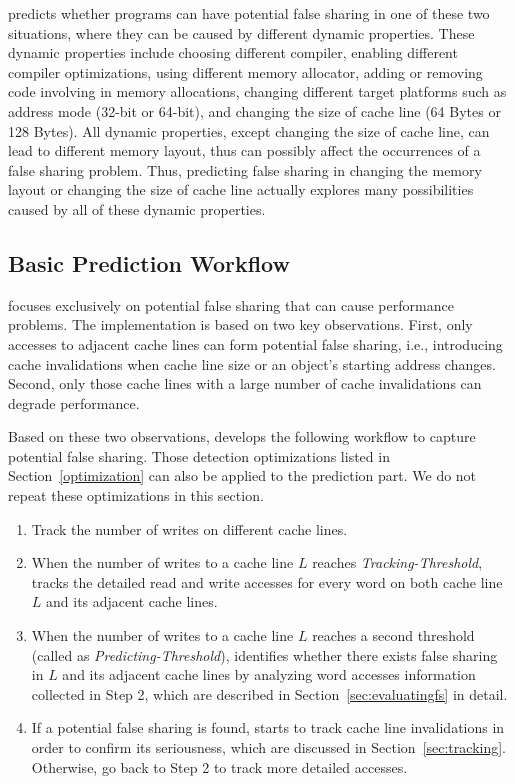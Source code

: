 \Predator{} predicts whether programs can have potential false sharing in one of these two situations, where they can be caused by different dynamic properties. These dynamic properties include choosing different compiler, enabling different compiler optimizations, using different memory allocator, adding or removing code involving in memory allocations, changing different target platforms such as address mode (32-bit or 64-bit), and changing the size of cache line (64 Bytes or 128 Bytes). 
All dynamic properties, except changing the size of cache line, can lead to different memory layout, thus can possibly affect the occurrences of a false sharing problem. Thus, predicting false sharing in changing the memory layout or changing the size of cache line actually explores many possibilities caused by all of these dynamic properties.

\subsection{Basic Prediction Workflow}
\label{sec:predictionmechanism} 

\Predator{} focuses exclusively on potential false sharing that can 
cause performance problems.
The implementation is based on
two key observations. First, only accesses to 
adjacent cache lines can form potential false sharing, 
i.e., introducing cache invalidations when cache line size
or an object's starting address changes.
Second, only those cache lines with a large number of cache invalidations can degrade performance.

Based on these two observations, \Predator{} develops 
the following workflow to capture potential false sharing.
Those detection optimizations listed in Section~\ref{optimization} can also be applied
to the prediction part. We do not repeat these optimizations in this section.

\begin{enumerate}
\item
Track the number of writes on different cache lines. 

\item
When the number of writes to a cache line $L$ reaches {\it Tracking-Threshold},
\predator{} tracks the detailed read and write accesses for every word on both cache line $L$ 
and its adjacent cache lines. 

\item
When the number of writes to a cache line $L$ reaches a second threshold (called as
{\it Predicting-Threshold}), 
\predator{} identifies whether there exists false sharing in $L$ and its adjacent cache lines by analyzing word accesses information collected in Step 2, which are described in 
Section~\ref{sec:evaluatingfs} in detail.

\item
If a potential false sharing is found, \predator{} starts to track cache line invalidations in order to confirm its seriousness, which are discussed in Section~\ref{sec:tracking}.
Otherwise, go back to Step 2 to track more detailed accesses.
 
\end{enumerate}

